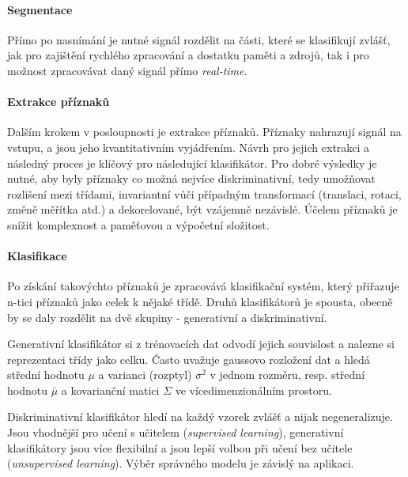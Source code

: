 
  
  \paragraph{Segmentace}
  Přímo po nasnímání je nutné signál rozdělit na části, které se klasifikují zvlášť, jak pro
  zajištění rychlého zpracování a dostatku paměti a zdrojů, tak i pro možnost zpracovávat
  daný signál přímo {\it real-time}.

  \paragraph{Extrakce příznaků}
  Dalším krokem v posloupnosti je extrakce příznaků. Příznaky nahrazují signál na vstupu,
  a jsou jeho kvantitativním vyjádřením. Návrh pro jejich extrakci a následný proces je klíčový
  pro následující klasifikátor. Pro dobré výsledky je nutné, aby byly příznaky co možná nejvíce
  diskriminativní, tedy umožňovat rozlišení mezi třídami, invariantní vůči případným transformací
  (translaci, rotaci, změně měřítka atd.) a dekorelované, být vzájemně nezávislé. Účelem příznaků
  je snížit komplexnost a paměťovou a výpočetní složitost.

  \paragraph{Klasifikace}
  Po získání takovýchto příznaků je zpracovává klasifikační systém, který přiřazuje n-tici příznaků
  jako celek k nějaké třídě. Druhů klasifikátorů je spousta, obecně by se daly rozdělit na dvě
  skupiny - generativní a diskriminativní.
  
  Generativní klasifikátor si z trénovacích dat odvodí jejich souvislost a nalezne si reprezentaci
  třídy jako celku. Často uvažuje gaussovo rozložení dat a hledá střední hodnotu $\mu$ a varianci (rozptyl)
  $\sigma^2$ v jednom rozměru, resp. střední hodnotu $\bar{\mu}$ a kovarianční matici $\Sigma$ ve
  vícedimenzionálním prostoru.
  
  Diskriminativní klasifikátor hledí na každý vzorek zvlášť a nijak negeneralizuje. Jsou vhodnější
  pro učení s učitelem ({\it supervised learning}), generativní klasifikátory jsou více flexibilní
  a jsou lepší volbou při učení bez učitele ({\it unsupervised learning}). Výběr správného
  modelu je závislý na aplikaci.

